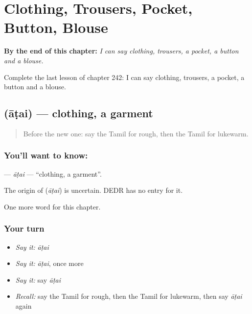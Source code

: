 
\chapter{Clothing, Trousers, Pocket, Button, Blouse}
\label{ch:ta-clothing-trousers-pocket-button-blouse}

\begin{chapteropening}
\textbf{By the end of this chapter:} \emph{I can say clothing, trousers, a pocket, a button and a blouse.}

Complete the last lesson of chapter 242: I can say clothing, trousers, a pocket, a button and a blouse.
\end{chapteropening}

\section[\texorpdfstring{\ta{ஆடை} (āṭai)}{ஆடை (āṭai)}]{ (āṭai) — clothing, a garment}

\label{lesson:TA-C242-atai}



\begin{quote}
Before the new one: say the Tamil for rough, then the Tamil for lukewarm.
\end{quote}

\subsection*{You'll want to know: }
\textbf{} — \emph{āṭai} — \textquotedblleft{}clothing, a garment\textquotedblright{}.

\begin{cousinweb}
The origin of \textbf{} (\emph{āṭai}) is uncertain. DEDR has no entry for it.
\end{cousinweb}

\begin{grammarlens}[title={What you've built}]
One more word for this chapter.
\end{grammarlens}

\subsection*{Your turn}
\begin{itemize}
\raggedright
  \item \emph{Say it:} \emph{āṭai}
  \item \emph{Say it:} \emph{āṭai}, once more
  \item \emph{Say it:} say \emph{āṭai}
  \item \emph{Recall:} say the Tamil for rough, then the Tamil for lukewarm, then say \emph{āṭai} again
\end{itemize}

